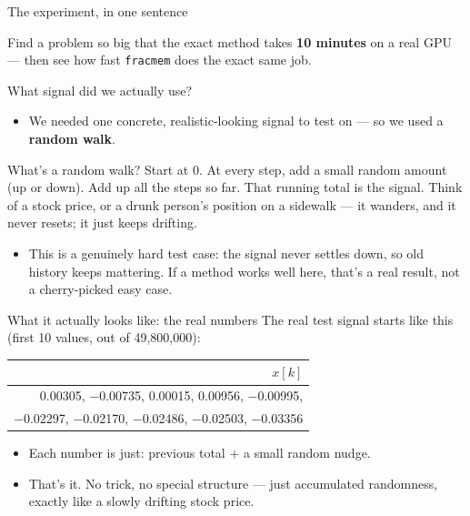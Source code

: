 \documentclass[11pt]{beamer}
\begin{document}
\begin{frame}{The experiment, in one sentence}
\begin{block}{}
\centering
\Large Find a problem so big that the exact method takes \textbf{10 minutes} on a real GPU --- then see how fast \texttt{fracmem} does the exact same job.
\end{block}
\end{frame}

\begin{frame}{What signal did we actually use?}
\begin{itemize}
\item We needed one concrete, realistic-looking signal to test on --- so we used a \textbf{random walk}.
\end{itemize}
\begin{exampleblock}{What's a random walk?}
Start at 0. At every step, add a small random amount (up or down). Add up all the steps so far. That running total is the signal. Think of a stock price, or a drunk person's position on a sidewalk --- it wanders, and it never resets; it just keeps drifting.
\end{exampleblock}
\begin{itemize}
\item This is a genuinely hard test case: the signal never settles down, so old history keeps mattering. If a method works well here, that's a real result, not a cherry-picked easy case.
\end{itemize}
\end{frame}

\begin{frame}{What it actually looks like: the real numbers}
The real test signal starts like this (first 10 values, out of 49,800,000):
\begin{table}
\centering
\small
\begin{tabular}{r}
\toprule
$x[k]$ \\
\midrule
0.00305, $-$0.00735, 0.00015, 0.00956, $-$0.00995, \\
$-$0.02297, $-$0.02170, $-$0.02486, $-$0.02503, $-$0.03356 \\
\bottomrule
\end{tabular}
\end{table}
\begin{itemize}
\item Each number is just: previous total $+$ a small random nudge.
\item That's it. No trick, no special structure --- just accumulated randomness, exactly like a slowly drifting stock price.
\end{itemize}
\end{frame}
\end{document}
